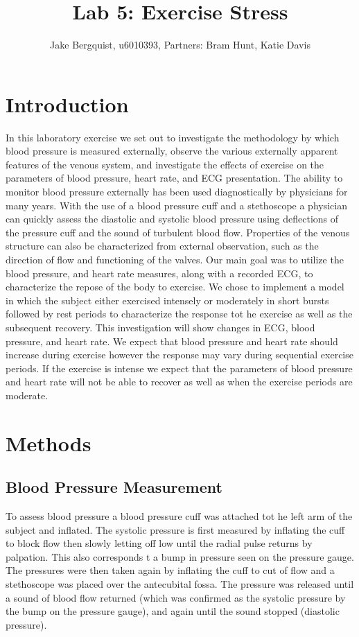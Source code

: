 \documentclass[12pt]{article}
\begin{document}
\title{Lab 5: Exercise Stress}
\author{Jake Bergquist, u6010393, Partners: Bram Hunt, Katie Davis }
\maketitle

\section{Introduction}
In this laboratory exercise we set out to investigate the methodology by which blood pressure is measured externally, observe the various externally apparent features of the venous system, and investigate the effects of exercise on the parameters of blood pressure, heart rate, and ECG presentation. The ability to monitor blood pressure externally has been used diagnostically by physicians for many years. With the use of a blood pressure cuff and a stethoscope a physician can quickly assess the diastolic and systolic blood pressure using deflections of the pressure cuff and the sound of turbulent blood flow. Properties of the venous structure can also be characterized from external observation, such as the direction of flow and functioning of the valves. Our main goal was to utilize the blood pressure, and heart rate measures, along with a recorded ECG, to characterize the repose of the body to exercise. We chose to implement a model in which the subject either exercised intensely or moderately in short bursts followed by rest periods to characterize the response tot he exercise as well as the subsequent recovery. This investigation will show changes in ECG, blood pressure, and heart rate. We expect that blood pressure and heart rate should increase during exercise however the response may vary during sequential exercise periods. If the exercise is intense we expect that the parameters of blood pressure and heart rate will not be able to recover as well as when the exercise periods are moderate.


\section{Methods}

\subsection{Blood Pressure Measurement}
To assess blood pressure a blood pressure cuff was attached tot he left arm of the subject and inflated. The systolic pressure is first measured by inflating the cuff to block flow then slowly letting off low until the radial pulse returns by palpation. This also corresponds t a bump in pressure seen on the pressure gauge. The pressures were then taken again by inflating the cuff to cut of flow and a stethoscope was placed over the antecubital fossa. The pressure was released until a sound of blood flow returned (which was confirmed as the systolic pressure by the bump on the pressure gauge), and again until the sound stopped (diastolic pressure).
\end{document}
